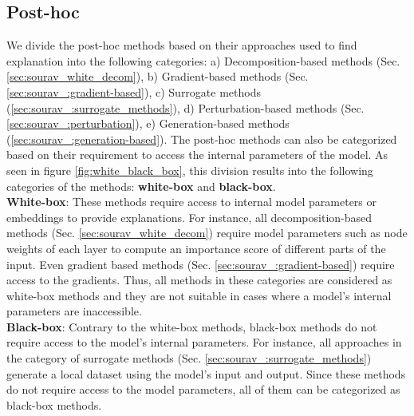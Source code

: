 \subsection{Post-hoc}
\label{sec:sourav_post_hoc}
We divide the post-hoc methods based on their approaches used to find explanation into the following categories: a) Decomposition-based methods (Sec. \ref{sec:sourav_white_decom}), b) Gradient-based methods (Sec. \ref{sec:sourav_:gradient-based}), c) Surrogate methods (\ref{sec:sourav_:surrogate_methods}), d) Perturbation-based methods (Sec. \ref{sec:sourav_:perturbation}), e) Generation-based methods (\ref{sec:sourav_:generation-based}). The post-hoc methods can also be categorized based on their requirement to access the internal parameters of the model. As seen in figure \ref{fig:white_black_box}, this division results into the following categories of the methods: \textbf{white-box} and \textbf{black-box}. \\
\noindent
\textbf{White-box}: These methods require access to internal model parameters or embeddings to provide explanations. For instance, all decomposition-based methods (Sec. \ref{sec:sourav_white_decom}) require model parameters such as node weights of each layer to compute an importance score of different parts of the input. Even gradient based methods (Sec. \ref{sec:sourav_:gradient-based}) require access to the gradients. Thus, all methods in these categories are considered as white-box methods and they are not suitable in cases where a model's internal parameters are inaccessible.\\
\noindent
 \textbf{Black-box}: Contrary to the white-box methods, black-box methods do not require access to the model's internal parameters. For instance, all approaches in the category of surrogate methods (Sec. \ref{sec:sourav_:surrogate_methods}) generate a local dataset using the model's input and output. Since these methods do not require access to the model parameters, all of them can be categorized as black-box methods.

